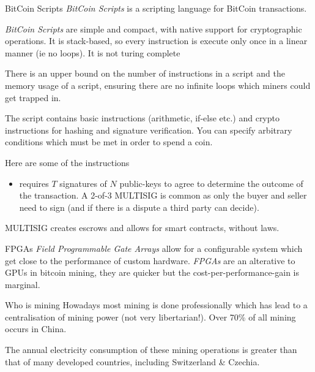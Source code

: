 \documentclass[11pt,a4paper]{article}
\begin{document}
  \begin{definition}{BitCoin Scripts}
    \textit{BitCoin Scripts} is a scripting language for BitCoin transactions.
    \par \textit{BitCoin Scripts} are simple and compact, with native support for cryptographic operations. It is stack-based, so every instruction is execute only once in a linear manner (ie no loops). It is not turing complete
    \par There is an upper bound on the number of instructions in a script and the memory usage of a script, ensuring there are no infinite loops which miners could get trapped in.
    \par The script contains basic instructions (arithmetic, if-else etc.) and crypto instructions for hashing and signature verification. You can specify arbitrary conditions which must be met in order to spend a coin.
    \par Here are some of the instructions
    \begin{itemize}
      \item[$T$-of-$N$ MULTISIG] requires $T$ signatures of $N$ public-keys to agree to determine the outcome of the transaction. A 2-of-3 MULTISIG is common as only the buyer and seller need to sign (and if there is a dispute a third party can decide).
    \end{itemize}
  \end{definition}

  \begin{remark}{MULTISIG creates escrows and allows for smart contracts, without laws.}

  \end{remark}

  \begin{definition}{FPGAs}
    \textit{Field Programmable Gate Arrays} allow for a configurable system which get close to the performance of custom hardware. \textit{FPGAs} are an alterative to GPUs in bitcoin mining, they are quicker but the cost-per-performance-gain is marginal.
  \end{definition}

  \begin{remark}{Who is mining\?}
    Howadays most mining is done professionally which has lead to a centralisation of mining power (not very libertarian!). Over 70\% of all mining occurs in China.
    \par The annual electricity consumption of these mining operations is greater than that of many developed countries, including Switzerland \& Czechia.
  \end{remark}
\end{document}
